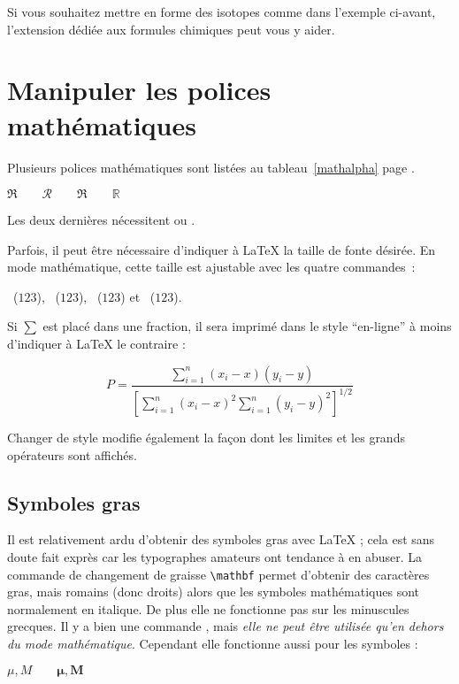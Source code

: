 Si vous souhaitez mettre en forme des isotopes comme dans l'exemple
ci-avant, l'extension  dédiée aux formules chimiques peut
vous y aider.


\section{Manipuler les polices mathématiques}\label{sec:fontsz}
Plusieurs polices mathématiques sont listées au tableau~\ref{mathalpha}
page \pageref{mathalpha}.
\begin{example}
 $\Re \qquad
  \mathcal{R} \qquad
  \mathfrak{R} \qquad
  \mathbb{R} \qquad $  
\end{example}
Les deux dernières nécessitent  ou .

Parfois, il peut être nécessaire d'indiquer à \LaTeX{} la taille
de fonte désirée. En mode mathématique, cette taille est ajustable
avec les quatre commandes~:
\begin{flushleft}
~($\displaystyle 123$),
 ~($\textstyle 123$), 
~($\scriptstyle 123$) et
~($\scriptscriptstyle 123$).
\end{flushleft}

Si $\sum$ est placé dans une fraction, il sera imprimé dans le style
\enquote{en-ligne} à
moins d'indiquer à \LaTeX{} le contraire :
\begin{example}
\begin{equation*}
 P = \frac{\displaystyle{
   \sum_{i=1}^n (x_i-x)
   (y_i-y)}}
   {\displaystyle{\left[
   \sum_{i=1}^n(x_i-x)^2
   \sum_{i=1}^n(y_i-y)^2
   \right]^{1/2}}}
\end{equation*}
\end{example}

Changer de style modifie également la façon dont les limites et les
grands opérateurs sont affichés.
 


\subsection{Symboles gras}

Il est relativement ardu d'obtenir des symboles gras avec \LaTeX{} ;
cela est sans doute fait exprès car les typographes amateurs ont
tendance à en abuser. La commande de changement de graisse
\verb|\mathbf| permet d'obtenir des caractères gras, mais romains
(donc droits) alors que les symboles mathématiques sont normalement en
italique. De plus elle ne fonctionne pas sur les minuscules
grecques. Il y a bien une commande , mais \emph{elle ne
  peut être utilisée qu'en dehors du mode mathématique}. Cependant
elle fonctionne aussi pour les symboles :
\begin{example}
$\mu, M \qquad 
\mathbf{\mu}, \mathbf{M}$
\qquad {}
\end{example}

